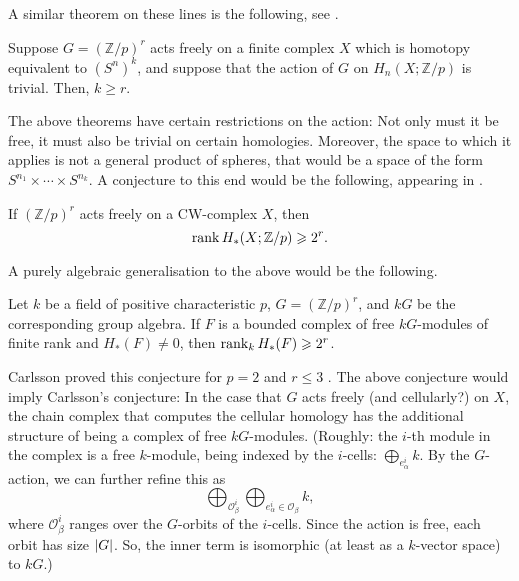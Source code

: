 \documentclass[12pt]{article}
\begin{document}
A similar theorem on these lines is the following, see \cite[Theorem I.1]{CarlssonProblemInCommutativeAlgebra}.
\begin{thm}
	Suppose $G = (\mathbb{Z}/p)^{r}$ acts freely on a finite complex $X$ which is homotopy equivalent to $(S^{n})^{k}$, and suppose that the action of $G$ on $H_{n}(X; \mathbb{Z}/p)$ is trivial. Then, $k \ge r$.
\end{thm}

The above theorems have certain restrictions on the action: Not only must it be free, it must also be trivial on certain homologies. Moreover, the space to which it applies is not a general product of spheres, that would be a space of the form $S^{n_{1}} \times \cdots \times S^{n_{k}}$. A conjecture to this end would be the following, appearing in \cite{CarlssonFreeModTwoToThreeActions}.

\begin{conj}[Carlsson]
	If $(\mathbb{Z}/p)^{r}$ acts freely on a CW-complex $X$, then
	\begin{equation*} 
		\operatorname{rank} H_{\ast}(X; \mathbb{Z}/p) \geqslant 2^{r}.
	\end{equation*}
\end{conj}

A purely algebraic generalisation to the above would be the following. 

\begin{conj}
	Let $k$ be a field of positive characteristic $p$, $G = (\mathbb{Z}/p)^{r}$, and $kG$ be the corresponding group algebra. If $F$ is a bounded complex of free $kG$-modules of finite rank and $H_{\ast}(F) \neq 0$, then $\operatorname{rank}_{k} H_{\ast}(F) \geqslant 2^{r}$.
\end{conj}
Carlsson proved this conjecture for $p = 2$ and $r \le 3$ \cite[Theorem 2]{CarlssonFreeModTwoToThreeActions}.  \newline
The above conjecture would imply Carlsson's conjecture: In the case that $G$ acts freely (and cellularly?) on $X$, the chain complex that computes the cellular homology has the additional structure of being a complex of free $kG$-modules. \Big(Roughly: the $i$-th module in the complex is a free $k$-module, being indexed by the $i$-cells: $\bigoplus_{e^{i}_{\alpha}} k$. By the $G$-action, we can further refine this as
\begin{equation*} 
	\bigoplus_{\mathcal{O}^{i}_{\beta}} \bigoplus_{e^{i}_{\alpha} \in \mathcal{O}_{\beta}} k,
\end{equation*}
where $\mathcal{O}^{i}_{\beta}$ ranges over the $G$-orbits of the $i$-cells. Since the action is free, each orbit has size ${\left\lvert G \right\lvert}$. So, the inner term is isomorphic (at least as a $k$-vector space) to $kG$.\Big)
\end{document}
